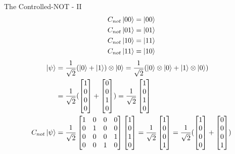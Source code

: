 \documentclass{beamer}
\begin{document}
\begin{frame}{The Controlled-NOT - II}
  {\tiny
    \begin{align*}
      C_{not}\ket{00} &= \ket{00} \\
      C_{not}\ket{01} &= \ket{01} \\
      C_{not}\ket{10} &= \ket{11} \\
      C_{not}\ket{11} &= \ket{10}
    \end{align*}
    \begin{align*}
      \ket\psi &= \frac{1}{\sqrt2} (\ket0 + \ket1) \otimes \ket0 = \frac{1}{\sqrt2} (\ket0 \otimes \ket0 + \ket1 \otimes \ket0) \\
      &= \frac{1}{\sqrt2} (\begin{bmatrix} 1 \\ 0 \\ 0 \\ 0 \end{bmatrix}  + \begin{bmatrix} 0 \\ 0 \\ 1 \\ 0 \end{bmatrix})
       = \frac{1}{\sqrt2} \begin{bmatrix} 1 \\ 0 \\ 1 \\ 0 \end{bmatrix} \\
      C_{not}\ket\psi &=
      \frac{1}{\sqrt2} \begin{bmatrix} 1 & 0 & 0 & 0 \\ 0 & 1 & 0 & 0 \\ 0 & 0 & 0 & 1 \\ 0 & 0 & 1 & 0 \end{bmatrix}  
                       \begin{bmatrix} 1 \\ 0 \\ 1 \\ 0 \end{bmatrix}
      = \frac{1}{\sqrt2} \begin{bmatrix} 1 \\ 0 \\ 0 \\ 1 \end{bmatrix}
      = \frac{1}{\sqrt2} (\begin{bmatrix} 1 \\ 0 \\ 0 \\ 0 \end{bmatrix} + \begin{bmatrix} 0 \\ 0 \\ 0 \\ 1 \end{bmatrix}) \\

\end{align*}}
\end{frame}
\end{document}
